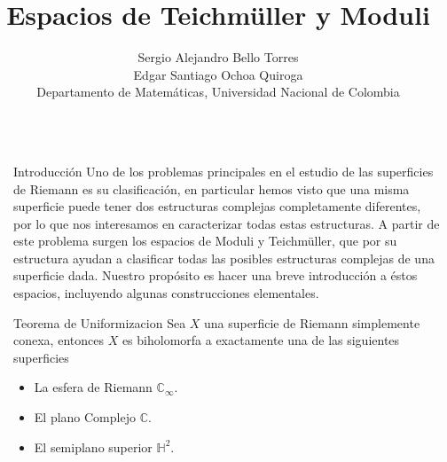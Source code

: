 \documentclass[final]{beamer}
\title{\Huge Espacios de Teichmüller y Moduli}
\author{\Large Sergio Alejandro Bello Torres\\Edgar Santiago Ochoa Quiroga\\Departamento de Matemáticas, Universidad Nacional de Colombia}
\newcommand\C{\ensuremath{\mathbb{C}}}
\newcommand\Hs{\ensuremath{\mathbb{H}}}
\newlength{\sepwidth}
\newlength{\colwidth}
\newcommand{\separatorcolumn}{\begin{column}{\sepwidth}\end{column}}
\begin{document}
\Large
\begin{frame}[t,fragile]
\begin{columns}[t]
\separatorcolumn

\begin{column}{\colwidth}

\begin{block}{Introducción}
Uno de los problemas principales en el estudio de las superficies de Riemann es su clasificación, en particular hemos visto que una misma superficie puede tener dos estructuras complejas completamente diferentes, por lo que nos interesamos en caracterizar todas estas estructuras. A partir de este problema surgen los espacios de Moduli y Teichmüller, que por su estructura ayudan a clasificar todas las posibles estructuras complejas de una superficie dada. Nuestro propósito es hacer una breve introducción a éstos espacios, incluyendo algunas construcciones elementales.
\end{block}

\begin{exampleblock}{Teorema de Uniformizacion}
Sea $X$ una superficie de Riemann simplemente conexa, entonces $X$ es biholomorfa a exactamente una de las siguientes superficies
        \begin{itemize}
            \item La esfera de Riemann $\C_{\infty}.$
            \item El plano Complejo $\C.$
            \item El semiplano superior $\Hs^2.$
        \end{itemize}
\end{exampleblock}
    

\end{column}
\end{columns}
\end{frame}
\end{document}

